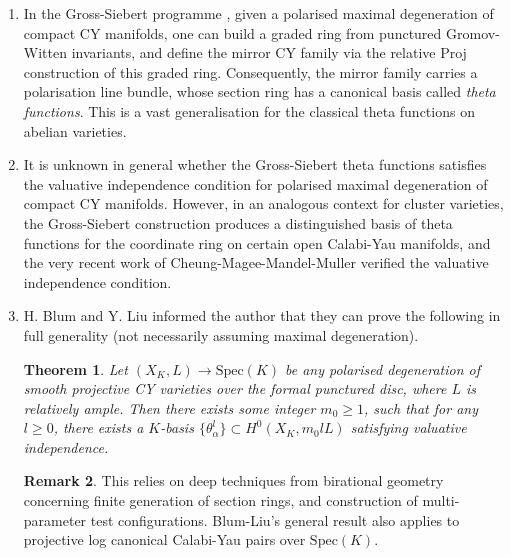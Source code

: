 \documentclass[a4paper]{article}
\newtheorem{thm}{Theorem}[section]
\theoremstyle{definition}
\newtheorem{rmk}[thm]{Remark}
\begin{document}
\begin{enumerate}
	\item  In the Gross-Siebert programme \cite{Gross, Grosstheta1,Grosstheta2, Grosstheta3}, given a polarised maximal degeneration of compact CY manifolds, one can build a graded ring from punctured Gromov-Witten invariants, and define the mirror CY family via the relative Proj construction of this graded ring. Consequently, the mirror family carries a polarisation line bundle, whose section ring has a canonical basis called \emph{theta functions}. This is a vast generalisation for the classical theta functions on abelian varieties.
	
	
	
	\item  It is unknown in general whether the Gross-Siebert theta functions satisfies the valuative independence condition for polarised maximal degeneration of compact CY manifolds. However, in an analogous context for cluster varieties, the Gross-Siebert construction produces a distinguished basis of theta functions for the coordinate ring on certain open Calabi-Yau manifolds, and the very recent work of Cheung-Magee-Mandel-Muller \cite{Travis} verified the valuative independence condition.
	
	
	
	
	\item  H. Blum and Y. Liu	informed the author that  they can prove the following in full generality (not necessarily assuming maximal degeneration).
	
	\begin{thm}
	\cite{BlumLiu}  Let $(X_K, L)\to \text{Spec}(K)$ be any polarised degeneration of smooth projective CY varieties  over the formal punctured disc, where $L$ is relatively ample. Then there exists some integer $m_0\geq 1$, such that for any $l\geq 0$, there exists a $K$-basis $\{ \theta_\alpha^l \}\subset H^0(X_K, m_0 lL)$ satisfying valuative independence. 
	\end{thm}
	
	
	
	
	\begin{rmk}
		This relies on deep techniques from birational geometry concerning finite generation of section rings, and construction of multi-parameter test configurations. Blum-Liu's general  result also applies to projective log canonical Calabi-Yau pairs over $\text{Spec}(K)$.
	\end{rmk}

	
\end{enumerate}
	
\end{document}
